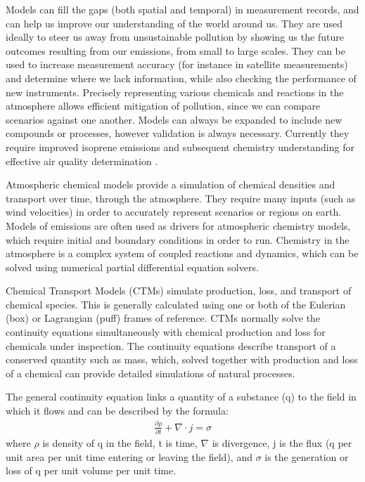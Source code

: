   Models can fill the gaps (both spatial and temporal) in measurement records, and can help us improve our understanding of the world around us.
  They are used ideally to steer us away from unsustainable pollution by showing us the future outcomes resulting from our emissions, from small to large scales.
  They can be used to increase measurement accuracy (for instance in satellite measurements) and determine where we lack information, while also checking the performance of new instruments.
  Precisely representing various chemicals and reactions in the atmosphere allows efficient mitigation of pollution, since we can compare scenarios against one another.
  Models can always be expanded to include new compounds or processes, however validation is always necessary.
  Currently they require improved isoprene emissions and subsequent chemistry understanding for effective air quality determination \citep{Marvin2017}.
  
  Atmospheric chemical models provide a simulation of chemical densities and transport over time, through the atmosphere.
  They require many inputs (such as wind velocities) in order to accurately represent scenarios or regions on earth.
  Models of emissions are often used as drivers for atmospheric chemistry models, which require initial and boundary conditions in order to run.
  Chemistry in the atmosphere is a complex system of coupled reactions and dynamics, which can be solved using numerical partial differential equation solvers.
  
  Chemical Transport Models (CTMs) simulate production, loss, and transport of chemical species.
  This is generally calculated using one or both of the Eulerian (box) or Lagrangian (puff) frames of reference.
  CTMs normally solve the continuity equations simultaneously with chemical production and loss for chemicals under inspection.
  The continuity equations describe transport of a conserved quantity such as mass, which, solved together with production and loss of a chemical can provide detailed simulations of natural processes.
  
  The general continuity equation links a quantity of a substance (q) to the field in which it flows and can be described by the formula:
  \begin{align*}
    \frac{\partial \rho}{\partial t} + \nabla \cdot j = \sigma 
  \end{align*}
  where $\rho$ is density of q in the field, t is time, $\nabla$ is divergence, j is the flux (q per unit area per unit time entering or leaving the field), and $\sigma$ is the generation or loss of q per unit volume per unit time.
  
